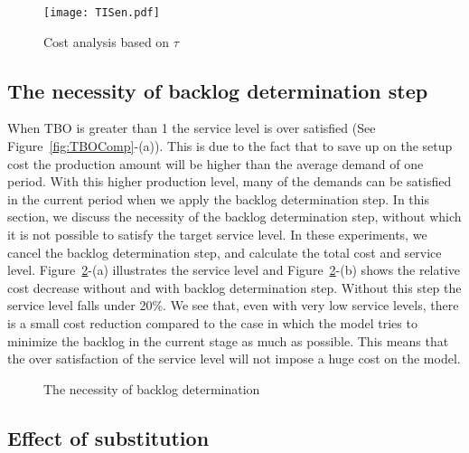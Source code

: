 \documentclass[11pt]{article}
\begin{document}
\begin{figure}[H]
\begin{center}
\texttt{[image: TISen.pdf]}
\caption{Cost analysis based on $\tau$} 
\label{fig:TISen}
\end{center}
\end{figure}


\subsection{The necessity of backlog determination step}
    When TBO is greater than 1 the service level is over satisfied (See Figure~\ref{fig:TBOComp}-(a)). This is due to the fact that to save up on the setup cost the production amount will be higher than the average demand of one period. With this higher production level, many of the demands can be satisfied in the current period when we apply the backlog determination step. In this section, we discuss the necessity of the backlog determination step, without which it is not possible to satisfy the target service level. In these experiments, we cancel the backlog determination step, and calculate the total cost and service level. Figure~\ref{fig:BacklogDetermination}-(a) illustrates the service level and Figure~\ref{fig:BacklogDetermination}-(b) shows the relative cost decrease without and with backlog determination step. Without this step the service level falls under 20\%.  We see that, even with very low service levels, there is a small cost reduction compared to the case in which the model tries to minimize the backlog in the current stage as much as possible. This means that the over satisfaction of the service level will not impose a huge cost on the model.
\begin{figure} [H]
    \centering
    \caption{The necessity of backlog determination}%
    \label{fig:BacklogDetermination}%
\end{figure}




\subsection{Effect of substitution}
\end{document}
